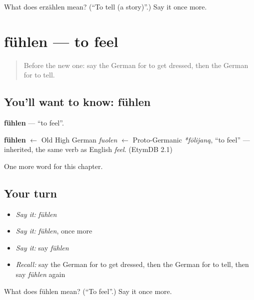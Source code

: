\begin{tcolorbox}[breakable,colback=teal!4,colframe=teal!35!black,title={Before you move on}]
What does erzählen mean? (\textquotedblleft{}To tell (a story)\textquotedblright{}.) Say it once more.
\end{tcolorbox}
\section[fühlen]{fühlen — to feel}

\label{lesson:GE-C140-fuehlen}



\begin{quote}
Before the new one: say the German for to get dressed, then the German for to tell.
\end{quote}

\subsection*{You'll want to know: fühlen}
\textbf{fühlen} — \textquotedblleft{}to feel\textquotedblright{}.

\begin{cousinweb}
\textbf{fühlen} $\leftarrow$ Old High German \emph{fuolen} $\leftarrow$ Proto-Germanic \emph{*fōlijaną}, \textquotedblleft{}to feel\textquotedblright{} — inherited, the same verb as English \emph{feel}. (EtymDB 2.1)
\end{cousinweb}

\begin{grammarlens}[title={What you've built}]
One more word for this chapter.
\end{grammarlens}

\subsection*{Your turn}
\begin{itemize}
\raggedright
  \item \emph{Say it:} \emph{fühlen}
  \item \emph{Say it:} \emph{fühlen}, once more
  \item \emph{Say it:} say \emph{fühlen}
  \item \emph{Recall:} say the German for to get dressed, then the German for to tell, then say \emph{fühlen} again
\end{itemize}

\begin{tcolorbox}[breakable,colback=teal!4,colframe=teal!35!black,title={Before you move on}]
What does fühlen mean? (\textquotedblleft{}To feel\textquotedblright{}.) Say it once more.
\end{tcolorbox}
